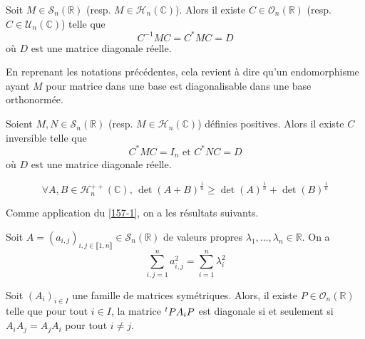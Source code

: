 	\begin{theorem}[Spectral]
		\label{157-1}
		Soit $M \in \mathcal{S}_n(\mathbb{R})$ (resp. $M \in \mathcal{H}_n(\mathbb{C})$). Alors il existe $C \in \mathcal{O}_n(\mathbb{R})$ (resp. $C \in \mathcal{U}_n(\mathbb{C})$) telle que
		\[ C^{-1}MC = C^* M C = D \]
		où $D$ est une matrice diagonale réelle.
	\end{theorem}
	
	\begin{remark}
		En reprenant les notations précédentes, cela revient à dire qu'un endomorphisme ayant $M$ pour matrice dans une base est diagonalisable dans une base orthonormée.
	\end{remark}
	
	\begin{corollary}
		Soient $M, N \in \mathcal{S}_n(\mathbb{R})$ (resp. $M \in \mathcal{H}_n(\mathbb{C})$) définies positives. Alors il existe $C$ inversible telle que
		\[ C^*MC = I_n \text{ et } C^*NC = D \]
		où $D$ est une matrice diagonale réelle.
	\end{corollary}
	
	
	\begin{application}
		\[ \forall A, B \in \mathcal{H}_n^{++}(\mathbb{C}), \, \det(A+B)^{\frac{1}{n}} \geq \det(A)^{\frac{1}{n}} + \det(B)^{\frac{1}{n}} \]
	\end{application}
	
	
	Comme application du \cref{157-1}, on a les résultats suivants.
	
	\begin{application}
		Soit $A = (a_{i,j})_{i,j \in \llbracket 1, n \rrbracket} \in \mathcal{S}_n(\mathbb{R})$ de valeurs propres $\lambda_1, \dots, \lambda_n \in \mathbb{R}$. On a
		\[ \sum_{i,j = 1}^n a_{i,j}^2 = \sum_{i=1}^n \lambda_i^2 \]
	\end{application}
	
	\begin{application}
		Soit $(A_i)_{i \in I}$ une famille de matrices symétriques. Alors, il existe $P \in \mathcal{O}_n(\mathbb{R})$ telle que pour tout $i \in I$, la matrice $\mathstrut ^t P A_i P$ est diagonale si et seulement si $A_i A_j = A_j A_i$ pour tout $i \neq j$.
	\end{application}
	
	
